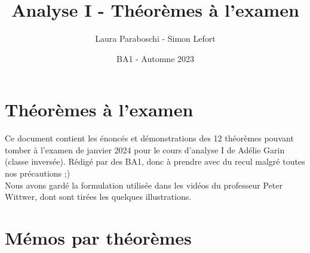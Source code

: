 \documentclass{article}
\title{Analyse I - Théorèmes à l'examen}
\author{Laura Paraboschi - Simon Lefort}
\date{BA1 - Automne 2023}
\begin{document}
\maketitle

\section{Théorèmes à l'examen}

Ce document contient les énoncés et démonstrations des 12 théorèmes pouvant tomber à l'examen de janvier 2024 pour le cours d'analyse I de Adélie Garin (classe inversée). Rédigé par des BA1, donc à prendre avec du recul malgré toutes nos précautions ;)\\
Nous avons gardé la formulation utilisée dans les vidéos du professeur Peter Wittwer, dont sont tirées les quelques illustrations.

\newpage

\section{Mémos par théorèmes}
\end{document}
